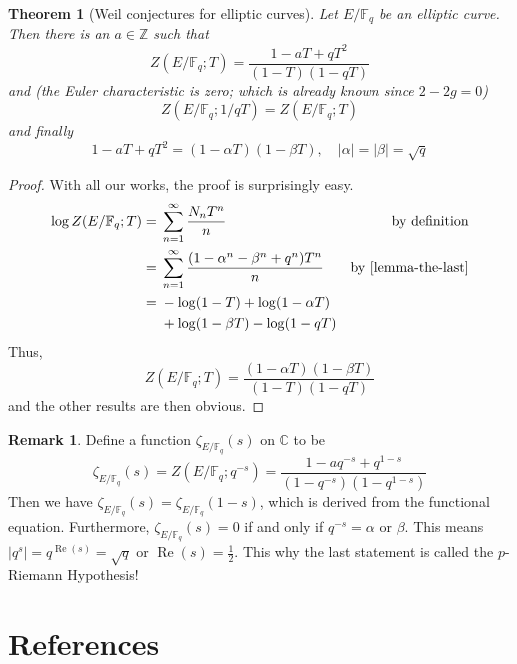 \documentclass[12pt]{article}
\newtheorem{theorem}{Theorem}[subsection]
\theoremstyle{remark}
\theoremstyle{definition}
\newtheorem{remark}{Remark}[subsection]
\newcommand{\Z}[0]{\mathbb{Z}}
\newcommand{\F}[0]{\mathbb{F}}
\newcommand{\C}[0]{\mathbb{C}}
\renewcommand{\Re}[0]{\operatorname{Re}}
\begin{document}
        \begin{theorem}[Weil conjectures for elliptic curves]\label{theorem-the-last}
            Let $E/\F_q$ be an elliptic curve. Then there is an $a\in\Z$ such that
            \[Z(E/\F_q;T)=\frac{1-aT+qT^2}{(1-T)(1-qT)}\]
            and (the Euler characteristic is zero; which is already known since $2-2g=0$)
            \[Z(E/\F_q;1/qT)=Z(E/\F_q;T)\]
            and finally
            \[1-aT+qT^2=(1-\alpha T)(1-\beta T),\quad|\alpha|=|\beta|=\sqrt{q}\]
        \end{theorem}
        \begin{proof}
            With all our works, the proof is surprisingly easy.
            \begin{align*}
                \log Z(E/\F_q;T)={}&\sum_{n=1}^\infty\frac{N_nT^n}{n} &\text{by definition}\\
                ={}&\sum_{n=1}^\infty\frac{(1-\alpha^n-\beta^n+q^n)T^n}{n}&\text{by \autoref{lemma-the-last}}\\
                ={}&-\log(1-T)+\log(1-\alpha T)\\
                &+\log(1-\beta T)-\log(1- qT)
            \end{align*}
            Thus,
            \[Z(E/\F_q;T)=\frac{(1-\alpha T)(1-\beta T)}{(1-T)(1-qT)}\]
            and the other results are then obvious.
        \end{proof}
        \begin{remark}\label{remark-p-rh}
            Define a function $\zeta_{E/\F_q}(s)$ on $\C$ to be
            \[\zeta_{E/\F_q}(s)=Z(E/\F_q;q^{-s})=\frac{1-aq^{-s}+q^{1-s}}{(1-q^{-s})(1-q^{1-s})}\]
            Then we have $\zeta_{E/\F_q}(s)=\zeta_{E/\F_q}(1-s)$, which is derived from the functional equation. Furthermore, $\zeta_{E/\F_q}(s)=0$ if and only if $q^{-s}=\alpha$ or $\beta$. This means $|q^{s}|=q^{\Re(s)}=\sqrt{q}$ or $\Re(s)=\frac{1}{2}$. This why the last statement is called the $p$-Riemann Hypothesis!
        \end{remark}
        \newpage
        \section{References}
        \renewcommand{\section}[2]{\vskip 0.01em}
        \printbibliography
\end{document}
